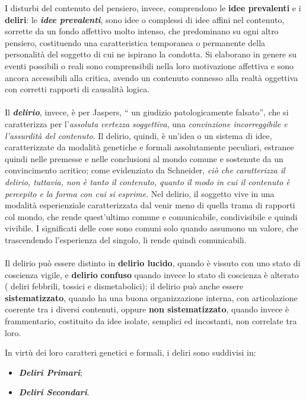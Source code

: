 I disturbi del contenuto del pensiero, invece, comprendono le
\textbf{idee prevalenti} e i \textbf{deliri}: le \textbf{\emph{idee
prevalenti}}, sono idee o complessi di idee affini nel contenuto,
sorrette da un fondo affettivo molto intenso, che predominano su ogni
altro pensiero, costituendo una caratteristica temporanea o permanente
della personalità del soggetto di cui ne ispirano la condotta. Si
elaborano in genere su eventi possibili o reali sono comprensibili nella
loro motivazione affettiva e sono ancora accessibili alla critica,
avendo un contenuto connesso alla realtà oggettiva con corretti rapporti
di causalità logica.
\\\\
Il \textbf{\emph{delirio}}, invece, è per Jaspers, `` un giudizio
patologicamente falsato'', che si caratterizza per l'\emph{assoluta
certezza soggettiva}, una \emph{convinzione incorreggibile e l'assurdità
del contenuto}. Il delirio, quindi, è un'idea o un sistema di idee,
caratterizzate da modalità genetiche e formali assolutamente peculiari,
estranee quindi nelle premesse e nelle conclusioni al mondo comune e
sostenute da un convincimento acritico; come evidenziato da Schneider,
\emph{ciò che caratterizza il delirio, tuttavia, non è tanto il
contenuto, quanto il modo in cui il contenuto è percepito e la forma con
cui si esprime}. Nel delirio, il soggetto vive in una modalità
esperienziale caratterizzata dal venir meno di quella trama di rapporti
col mondo, che rende quest'ultimo comune e comunicabile, condivisibile e
quindi vivibile. I significati delle cose sono comuni solo quando
assumono un valore, che trascendendo l'esperienza del singolo, li rende
quindi comunicabili.
\\\\
Il delirio può essere distinto in \textbf{delirio lucido}, quando è
vissuto con uno stato di coscienza vigile, e \textbf{delirio}
\textbf{confuso} quando invece lo stato di coscienza è alterato ( deliri
febbrili, tossici e dismetabolici); il delirio può anche essere
\textbf{sistematizzato}, quando ha una buona organizzazione interna, con
articolazione coerente tra i diversi contenuti, oppure \textbf{non
sistematizzato}, quando invece è frammentario, costituito da idee
isolate, semplici ed incostanti, non correlate tra loro.

In virtù dei loro caratteri genetici e formali, i deliri sono suddivisi
in:

\begin{itemize}
\item
  \textbf{\emph{Deliri Primari}};
\item
  \textbf{\emph{Deliri Secondari}}.
\end{itemize}

